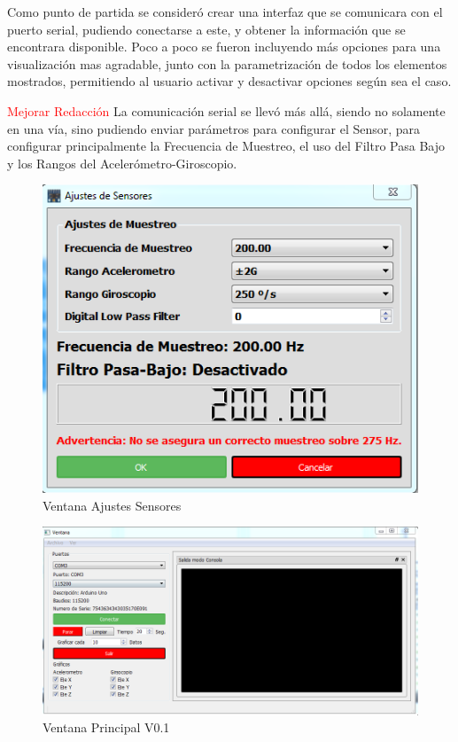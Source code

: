 \documentclass[12pt,a4paper]{article}
\begin{document}
Como punto de partida se consideró crear una interfaz que se comunicara con el puerto serial, pudiendo conectarse a este, y obtener la información que se encontrara disponible.
Poco a poco se fueron incluyendo más opciones para una visualización mas agradable, junto con la parametrización de todos los elementos mostrados, permitiendo al usuario activar y desactivar opciones según sea el caso.

\textcolor{red}{Mejorar Redacción}
La comunicación serial se llevó más allá, siendo no solamente en una vía, sino pudiendo enviar parámetros para configurar el Sensor, para configurar principalmente la Frecuencia de Muestreo, el uso del Filtro Pasa Bajo y los Rangos del Acelerómetro-Giroscopio.

\begin{figure}[H]
\centering
  \includegraphics[scale=0.6]{images/AjustesSensores}
  \caption{Ventana Ajustes Sensores}
  \label{fig:ajustessensores}
\end{figure}


\begin{figure}[H]
\centering
  \includegraphics[scale=0.6]{images/mainwindow}
  \caption{Ventana Principal V0.1}
  \label{fig:mainwindow}
\end{figure}
\end{document}
